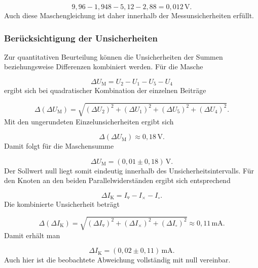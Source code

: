 \documentclass{report}
\begin{document}
\begin{equation}
9{,}96
-
1{,}948
-
5{,}12
-
2{,}88
=
0{,}012\,\mathrm{V}.
\end{equation}
\noindent
Auch diese Maschengleichung ist daher innerhalb der Messunsicherheiten erfüllt.


\subsubsection{Berücksichtigung der Unsicherheiten}
\noindent
Zur quantitativen Beurteilung können die Unsicherheiten der Summen beziehungsweise
Differenzen kombiniert werden. Für die Masche

\begin{equation}
\Delta U_\mathrm{M}
=
U_2-U_1-U_5-U_4
\end{equation}
\noindent
ergibt sich bei quadratischer Kombination der einzelnen Beiträge

\begin{equation}
\Delta(\Delta U_\mathrm{M})
=
\sqrt{
(\Delta U_2)^2+
(\Delta U_1)^2+
(\Delta U_5)^2+
(\Delta U_4)^2
}.
\end{equation}
\noindent
Mit den ungerundeten Einzelunsicherheiten ergibt sich

\begin{equation}
\Delta(\Delta U_\mathrm{M})
\approx
0{,}18\,\mathrm{V}.
\end{equation}
\noindent
Damit folgt für die Maschensumme

\begin{equation}
\boxed{
\Delta U_\mathrm{M}
=
(0{,}01\pm0{,}18)\,\mathrm{V}
}.
\end{equation}
\noindent
Der Sollwert null liegt somit eindeutig innerhalb des Unsicherheitsintervalls.
\noindent
Für den Knoten an den beiden Parallelwiderständen ergibt sich entsprechend

\begin{equation}
\Delta I_\mathrm{K}
=
I_{\triangledown}
-I_{\times}
-I_{\circ}.
\end{equation}
\noindent
Die kombinierte Unsicherheit beträgt

\begin{equation}
\Delta(\Delta I_\mathrm{K})
=
\sqrt{
(\Delta I_{\triangledown})^2+
(\Delta I_{\times})^2+
(\Delta I_{\circ})^2
}
\approx
0{,}11\,\mathrm{mA}.
\end{equation}
\noindent
Damit erhält man

\begin{equation}
\boxed{
\Delta I_\mathrm{K}
=
(0{,}02\pm0{,}11)\,\mathrm{mA}
}.
\end{equation}
\noindent
Auch hier ist die beobachtete Abweichung vollständig mit null vereinbar.
\end{document}
